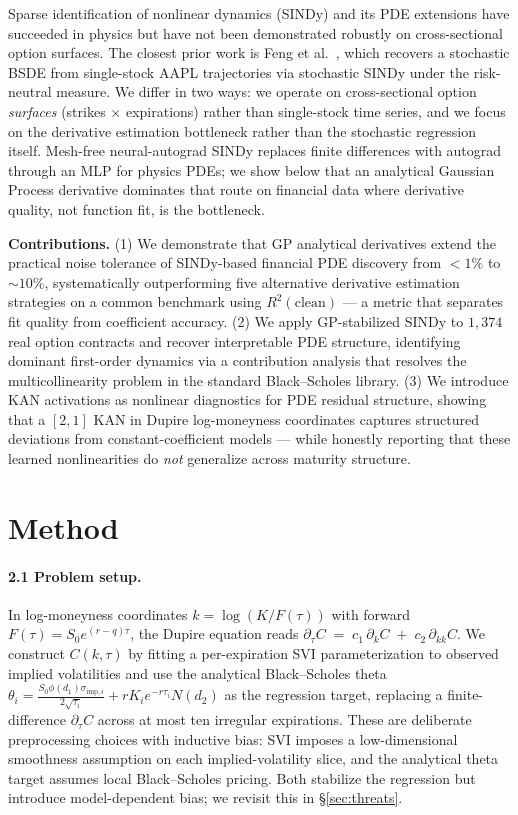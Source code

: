 \documentclass[10pt]{article}
\begin{document}
Sparse identification of nonlinear dynamics (SINDy) \citep{brunton2016sindy} and its PDE extensions \citep{rudy2017pde,messenger2021weak} have succeeded in physics but have not been demonstrated robustly on cross-sectional option surfaces. The closest prior work is Feng et al.\ \citep{feng2025feynmankac}, which recovers a stochastic BSDE from single-stock AAPL trajectories via stochastic SINDy under the risk-neutral measure. We differ in two ways: we operate on cross-sectional option \emph{surfaces} (strikes $\times$ expirations) rather than single-stock time series, and we focus on the derivative estimation bottleneck rather than the stochastic regression itself. Mesh-free neural-autograd SINDy \citep{gao2025meshfree} replaces finite differences with autograd through an MLP for physics PDEs; we show below that an analytical Gaussian Process derivative dominates that route on financial data where derivative quality, not function fit, is the bottleneck.

\textbf{Contributions.} (1) We demonstrate that GP analytical derivatives extend the practical noise tolerance of SINDy-based financial PDE discovery from $<\!1\%$ to ${\sim}10\%$, systematically outperforming five alternative derivative estimation strategies on a common benchmark using $R^2(\text{clean})$ --- a metric that separates fit quality from coefficient accuracy. (2) We apply GP-stabilized SINDy to $1{,}374$ real option contracts and recover interpretable PDE structure, identifying dominant first-order dynamics via a contribution analysis that resolves the multicollinearity problem in the standard Black--Scholes library. (3) We introduce KAN activations as nonlinear diagnostics for PDE residual structure, showing that a $[2,1]$ KAN in Dupire log-moneyness coordinates captures structured deviations from constant-coefficient models --- while honestly reporting that these learned nonlinearities do \emph{not} generalize across maturity structure.

\section{Method}

\paragraph{2.1 Problem setup.} In log-moneyness coordinates $k{=}\log(K/F(\tau))$ with forward $F(\tau){=}S_0 e^{(r{-}q)\tau}$, the Dupire equation reads $\partial_\tau C \;=\; c_1\,\partial_k C \;+\; c_2\,\partial_{kk} C$. We construct $C(k,\tau)$ by fitting a per-expiration SVI parameterization \citep{gatheral2014arbitrage} to observed implied volatilities and use the analytical Black--Scholes theta $\theta_i{=}\tfrac{S_0\phi(d_1)\sigma_{\text{imp},i}}{2\sqrt{\tau_i}}{+}rK_i e^{-r\tau_i}N(d_2)$ as the regression target, replacing a finite-difference $\partial_\tau C$ across at most ten irregular expirations. These are deliberate preprocessing choices with inductive bias: SVI imposes a low-dimensional smoothness assumption on each implied-volatility slice, and the analytical theta target assumes local Black--Scholes pricing. Both stabilize the regression but introduce model-dependent bias; we revisit this in \S\ref{sec:threats}.
\end{document}
